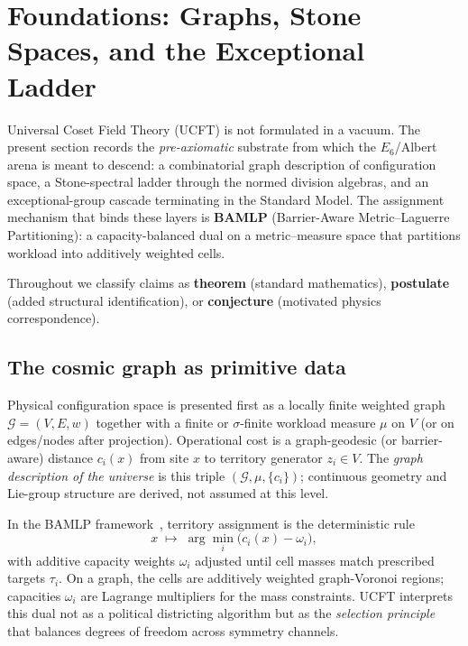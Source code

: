 \section{Foundations: Graphs, Stone Spaces, and the Exceptional Ladder}
\label{sec:bamlp:main}

Universal Coset Field Theory (UCFT) is not formulated in a vacuum. The present
section records the \emph{pre-axiomatic} substrate from which the $E_6$/Albert
arena is meant to descend: a combinatorial graph description of configuration
space, a Stone-spectral ladder through the normed division algebras, and an
exceptional-group cascade terminating in the Standard Model. The assignment
mechanism that binds these layers is \textbf{BAMLP} (Barrier-Aware
Metric--Laguerre Partitioning): a capacity-balanced dual on a metric--measure
space that partitions workload into additively weighted cells.

Throughout we classify claims as \textbf{theorem} (standard mathematics),
\textbf{postulate} (added structural identification), or
\textbf{conjecture} (motivated physics correspondence).

\subsection{The cosmic graph as primitive data}
\label{sec:bamlp:graph}

\begin{postulate}\label{post:bamlp:graph}
Physical configuration space is presented first as a locally finite weighted
graph $\mathcal{G}=(V,E,w)$ together with a finite or $\sigma$-finite workload
measure $\mu$ on $V$ (or on edges/nodes after projection). Operational cost is
a graph-geodesic (or barrier-aware) distance $c_i(x)$ from site $x$ to
territory generator $z_i\in V$. The \emph{graph description of the universe} is
this triple $(\mathcal{G},\mu,\{c_i\})$; continuous geometry and Lie-group
structure are derived, not assumed at this level.
\end{postulate}

In the BAMLP framework~\cite{BAMLP:2026}, territory assignment is the
deterministic rule
\begin{equation}
  x \;\longmapsto\; \arg\min_i\bigl(c_i(x)-\omega_i\bigr),
  \label{eq:bamlp:assign}
\end{equation}
with additive capacity weights $\omega_i$ adjusted until cell masses match
prescribed targets $\tau_i$. On a graph, the cells are additively weighted
graph-Voronoi regions; capacities $\omega_i$ are Lagrange multipliers for the
mass constraints. UCFT interprets this dual not as a political districting
algorithm but as the \emph{selection principle} that balances degrees of
freedom across symmetry channels.

